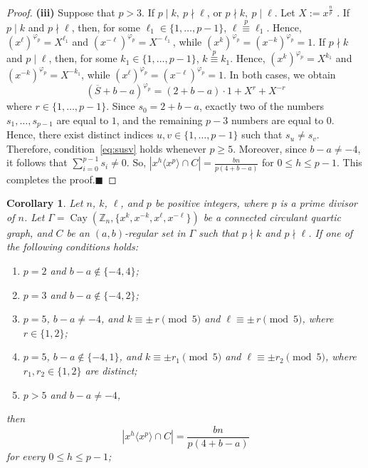 \documentclass[12pt]{article}
\newtheorem{cor}[formula]{Corollary}
\begin{document}
\begin{proof}
\indent\textbf{(iii)}	
Suppose that \(p>3\). If \(p\mid k,\ p\nmid \ell\), or \(p\nmid k,\ p\mid \ell\). Let \(X:=x^{\frac{n}{p}}\) . If \(p\mid k\) and \(p\nmid \ell\), then, for some \(\ell_1\in\{1,\ldots,p-1\}\), \(\ell\stackrel{p}{\equiv}\ell_1\). Hence, \((x^\ell)^{\varphi_p}=X^{\ell_1}\) and \((x^{-\ell})^{\varphi_p}=X^{-\ell_1}\), while \((x^k)^{\varphi_p}=(x^{-k})^{\varphi_p}=1\). If \(p\nmid k\) and \(p\mid \ell\), then, for some \(k_1\in\{1,\ldots,p-1\}\), \(k\stackrel{p}{\equiv}k_1\). Hence, \((x^k)^{\varphi_p}=X^{k_1}\) and \((x^{-k})^{\varphi_p}=X^{-k_1}\), while \((x^\ell)^{\varphi_p}=(x^{-\ell})^{\varphi_p}=1\).  In both cases, we obtain
\[
(\overline{S}+b-a)^{\varphi_p}
=(2+b-a)\cdot1+X^r+X^{-r}
\]
where \(r\in\{1,\ldots,p-1\}\). Since $s_0=2+b-a$, exactly two of the numbers $s_1,\ldots,s_{p-1}$ are equal to $1$, and the remaining $p-3$ numbers are equal to $0$. Hence, there exist distinct indices $u,v\in\{1,\ldots,p-1\}$ such that $s_u\neq s_v$. Therefore, condition~\eqref{eq:susv} holds whenever $p\ge5$.  Moreover, since \(b-a\neq -4\), it follows that \(\sum_{i=0}^{p-1}s_i\neq 0\).
So, $
\left|x^h\langle x^p\rangle\cap C\right|
=
\frac{bn}{p(4+b-a)}$ for $0\le h\le p-1$. This completes the proof.\hfill$\blacksquare$	  	
	\end{proof}	
\begin{cor}\label{cor:coset-size2}
	Let $n$, $k$, $\ell$, and $p$ be positive integers, where $p$ is a prime divisor of $n$. Let $\Gamma=\operatorname{Cay}(\mathbb{Z}_n,\{x^k,x^{-k},x^\ell,x^{-\ell}\})$ be a connected circulant quartic graph, and $C$ be an $(a,b)$-regular set in $\Gamma$ such that $p\nmid k$ and $p\nmid \ell$. If one of the following conditions holds:
	\begin{enumerate}
		\item[(i)] $p=2$ and $b-a\notin\{-4,4\}$;
		\item[(ii)] $p=3$ and $b-a\notin\{-4,2\}$;
		\item[(iii)] $p=5$, $b-a\neq -4$, and
		$k\equiv \pm \, r \pmod{5}$ and $\ell\equiv \pm \, r \pmod{5}$,
		where $r\in\{1,2\}$;
		\item[(iv)] $p=5$, $b-a\notin\{-4,1\}$, and $k\equiv \pm r_1 \pmod{5}$ and $\ell\equiv \pm r_2 \pmod{5}$,
		where $r_1,r_2\in\{1,2\}$ are distinct;
		\item[(v)] $p>5$ and $b-a\neq -4$,
	\end{enumerate}
	then
	\[
	\left|x^h\langle x^p\rangle\cap C\right|
	=\frac{bn}{p(4+b-a)}
	\]
	for every $0\le h\le p-1$;
\end{cor}
\end{document}
